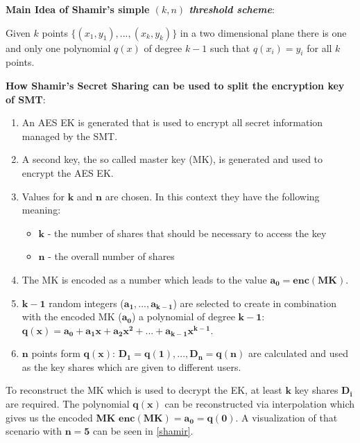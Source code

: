 \documentclass[runningheads]{llncs}
\begin{document}
\noindent
\textbf{Main Idea of Shamir's simple $(k,n)$ \textit{threshold scheme}}:
\newline

\noindent
Given $k$ points $\{(x_1,y_1),...,(x_k,y_k)\}$ in a two dimensional plane there is one and only one polynomial $q(x)$ of degree $k-1$ such that $q(x_i) = y_i$ for all $k$ points.
\newline

\noindent
\textbf{How Shamir's Secret Sharing can be used to split the encryption key of SMT}:
\newline

\noindent

\begin{enumerate}
    \setlength\itemsep{1mm}
    \item An AES EK is generated that is used to encrypt all secret information managed by the SMT.
    \item A second key, the so called master key (MK), is generated and used to encrypt the AES EK.
    \item Values for $\bm{k}$ and $\bm{n}$ are chosen. In this context they have the following meaning: 
\begin{itemize}
    \item $\bm{k}$ - the number of shares that should be necessary to access the key
    \item $\bm{n}$ - the overall number of shares
\end{itemize}
    \item The MK is encoded as a number which leads to the value $\bm{a_0 = enc(MK)}$.
    \item $\bm{k-1}$ random integers ($\bm{a_1,...,a_{k-1}}$) are selected to create in combination with the encoded MK ($\bm{a_0}$) a polynomial of degree $\bm{k-1}$:\newline
     $\bm{q(x) = a_0 + a_1x + a_2x^2 + ... + a_{k-1}x^{k-1}}$.
    \item $\bm{n}$ points form $\bm{q(x)}$: $\bm{D_1 = q(1), ..., D_n = q(n)}$ are calculated and used as the key shares which are given to different users.
\end{enumerate}

To reconstruct the MK which is used to decrypt the EK, at least $\bm{k}$ key shares $\bm{D_i}$ are required. The polynomial $\bm{q(x)}$ can be reconstructed via interpolation which gives us the encoded \textbf{MK} $\bm{enc(MK) = a_0 = q(0)}$. A visualization of that scenario with $\bm{n = 5}$ can be seen in \autoref{shamir}.
\newline
\end{document}
